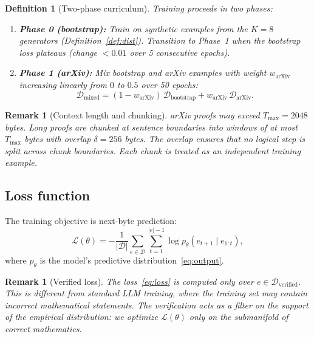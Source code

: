 \documentclass[11pt,a4paper]{article}
\newtheorem{definition}[theorem]{Definition}
\newtheorem{remark}[theorem]{Remark}
\newcommand{\cD}{\mathcal{D}}
\newcommand{\cL}{\mathcal{L}}
\begin{document}
\begin{definition}[Two-phase curriculum]\label{def:curriculum}
Training proceeds in two phases:
\begin{enumerate}[label=(\roman*),nosep]
\item \textbf{Phase 0 (bootstrap):}
  Train on synthetic examples from the $K = 8$ generators
  (Definition~\ref{def:dist}).
  Transition to Phase~1 when the bootstrap loss plateaus
  (change $< 0.01$ over 5 consecutive epochs).
\item \textbf{Phase 1 (arXiv):}
  Mix bootstrap and arXiv examples with weight
  $w_{\text{arXiv}}$ increasing linearly from $0$ to $0.5$
  over 50 epochs:
  \[
  \cD_{\text{mixed}} = (1 - w_{\text{arXiv}}) \, \cD_{\text{bootstrap}}
    + w_{\text{arXiv}} \, \cD_{\text{arXiv}}.
  \]
\end{enumerate}
\end{definition}

\begin{remark}[Context length and chunking]\label{rem:chunking}
arXiv proofs may exceed $T_{\max} = 2048$ bytes.
Long proofs are chunked at sentence boundaries into windows
of at most $T_{\max}$ bytes with overlap $\delta = 256$ bytes.
The overlap ensures that no logical step is split across
chunk boundaries.
Each chunk is treated as an independent training example.
\end{remark}

\subsection{Loss function}

The training objective is next-byte prediction:
\begin{equation}\label{eq:loss}
\cL(\theta) = -\frac{1}{|\cD|} \sum_{e \in \cD}
  \sum_{t=1}^{|e|-1} \log p_\theta(e_{t+1} \mid e_{1:t}),
\end{equation}
where $p_\theta$ is the model's predictive distribution~\eqref{eq:output}.

\begin{remark}[Verified loss]\label{rem:verified-loss}
The loss~\eqref{eq:loss} is computed only over
$e \in \cD_{\text{verified}}$.
This is different from standard LLM training, where the
training set may contain incorrect mathematical statements.
The verification acts as a filter on the support of the
empirical distribution: we optimize $\cL(\theta)$ only on
the submanifold of correct mathematics.
\end{remark}
\end{document}
